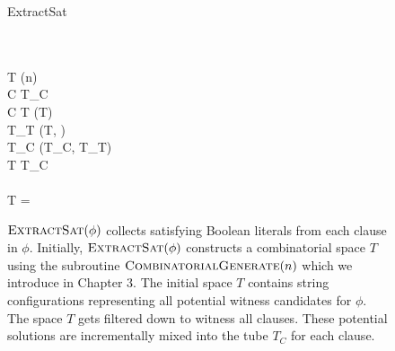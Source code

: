 
\begin{figure}[htbp]
	\renewcommand{\figurename}{Algorithm}
	\renewcommand{\thepseudocode}{\ref{extractSatAlgorithm}}
	
	\begin{center}

	\begin{pseudocode}[shadowbox]{ExtractSat}{\phi}
	
	\\
	\\
		T \GETS {}(n)\\	
		\FOREACH {} C  \phi \DO
			\BEGIN
				T_C \GETS \emptyset \\
			
				\FOREACH {} \ell {} C \DO
					\BEGIN
						T   \GETS \text{purify}(T)\\ 
						T_T \GETS {}(T, \ell) \\
						T_C \GETS {}(T_C, T_T)
					\END \\
				T \GETS T_C \\
			\END \\
			
		\IF T = \emptyset
			\THEN {}\\
	\end{pseudocode}
	
\caption{$\text{\sc ExtractSat}(\phi)$ collects satisfying Boolean literals from each clause in $\phi$.  Initially, $\text{\sc ExtractSat}(\phi)$ constructs a combinatorial space $T$ using the subroutine $\text{\sc CombinatorialGenerate}(n)$ which we introduce in Chapter 3.  The initial space $T$ contains string configurations representing all potential witness candidates for $\phi$.  The space $T$ gets filtered down to witness all clauses.  These potential solutions are incrementally mixed into the tube $T_C$ for each clause.  }
\label{extractSatAlgorithm}
\end{center}
\end{figure}
